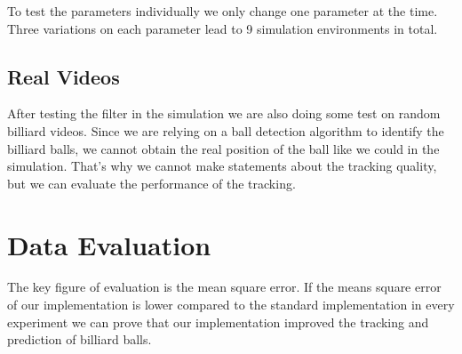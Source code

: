\documentclass[titlepage, a4paper, 11pt]{scrartcl}
\begin{document}
            To test the parameters individually we only change one parameter at the time.
            Three variations on each parameter lead to 9 simulation environments in total.

        \subsection{Real Videos}

        After testing the filter in the simulation we are also doing some test on random billiard videos.
        Since we are relying on a ball detection algorithm to identify the billiard balls, we cannot obtain the real position of the ball like we could in the simulation.
        That's why we cannot make statements about the tracking quality, but we can evaluate the performance of the tracking.

    \section{Data Evaluation}

    The key figure of evaluation is the mean square error.
    If the means square error of our implementation is lower compared to the standard implementation in every experiment we can prove that our implementation improved the tracking and prediction of billiard balls.



     
    
\end{document}

